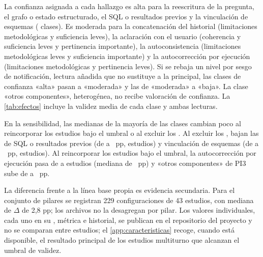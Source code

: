 La confianza asignada a cada hallazgo es alta para la reescritura de la pregunta, el grafo o estado estructurado, el SQL o resultados previos y la vinculación de esquemas (\nConfAlta{} clases). Es moderada para la concatenación del historial (limitaciones metodológicas y suficiencia leves), la aclaración con el usuario (coherencia y suficiencia leves y pertinencia importante), la autoconsistencia (limitaciones metodológicas leves y suficiencia importante) y la autocorrección por ejecución (limitaciones metodológicas y pertinencia leves). Si se rebaja un nivel por sesgo de notificación, lectura añadida que no sustituye a la principal, las clases de confianza «alta» pasan a «moderada» y las de «moderada» a «baja». La clase «otros componentes», heterogénea, no recibe valoración de confianza. La \cref{tab:efectos} incluye la validez media de cada clase y ambas lecturas.

En la sensibilidad, las medianas de la mayoría de las clases cambian poco al reincorporar los estudios bajo el umbral o al excluir los . Al excluir los , bajan las de SQL o resultados previos (de \efSQLPrevMed{} a \efSQLPrevMedSinPre{}~pp, \efSQLPrevNSinPre{} estudios) y vinculación de esquemas (de \efVincMed{} a \efVincMedSinPre{}~pp, \efVincNSinPre{} estudios). Al reincorporar los estudios bajo el umbral, la autocorrección por ejecución pasa de \efAutocorrN{} a \efAutocorrNTodos{} estudios (mediana de \efAutocorrMedTodos{}~pp) y «otros componentes» de PI3 sube de \efPItresOtrosMed{} a \efPItresOtrosMedTodos{}~pp.

La diferencia frente a la línea base propia es evidencia secundaria. Para el conjunto de pilares se registran 229 configuraciones de 43 estudios, con mediana de $\Delta$ de 2,8 pp; los archivos no la desagregan por pilar. Los valores individuales, cada uno en su , métrica e historial, se publican en el repositorio del proyecto y no se comparan entre estudios; el \cref{app:caracteristicas} recoge, cuando está disponible, el resultado principal de los estudios multiturno que alcanzan el umbral de validez.


